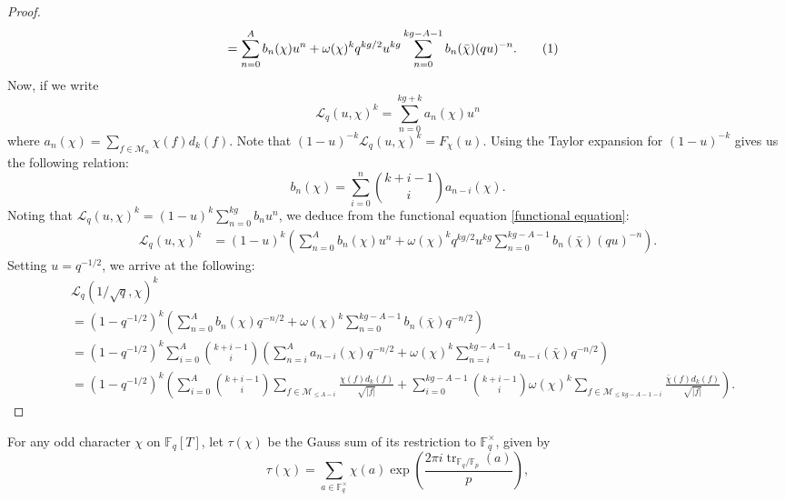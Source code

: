 \documentclass[table]{amsart}
\newcommand{\cM}{\mathcal{M}}
\newcommand{\op}[1]{\operatorname{#1}}
\newcommand\numberthis{\addtocounter{equation}{1}\tag{\theequation}}
\numberwithin{equation}{section}
\begin{document}
\begin{proof}
\begin{align*}
    &=\sum_{n=0}^{A} b_n(\chi) u^{n}+\omega(\chi)^k q^{kg/2}u^{kg}\sum_{n=0}^{kg-A-1}b_n(\bar \chi)(qu)^{-n}.\numberthis\label{functional equation}
\end{align*}
Now, if we  write
$$
\mathcal{L}_q\left(u, \chi\right)^{k}=\sum_{n=0}^{k g+k} a_n(\chi) u^{n}
$$
where $a_n(\chi)=\sum_{f \in \mathcal{M}_{n}} \chi(f) d_{k}(f)$.  %
Note that $(1-u)^{-k}\mathcal{L}_q\left(u, \chi\right)^{k}=F_\chi(u)$. Using the Taylor expansion for $(1-u)^{-k}$ gives us the following relation: 
\begin{equation}\label{binomial inversion}
    b_n(\chi)=\sum_{i=0}^{n} \binom{k+i-1}{i} a_{n-i}(\chi).
\end{equation}
 Noting that $\mathcal{L}_q\left(u, \chi\right)^{k}=(1-u)^k\sum_{n=0}^{kg}b_n u^n$, we deduce from the functional equation \eqref{functional equation}:
\begin{align*}
    \mathcal{L}_q\left(u, \chi\right)^{k}&=(1-u)^k\left(\sum_{n=0}^{A} b_n(\chi) u^{n}+\omega(\chi)^k q^{kg/2}u^{kg}\sum_{n=0}^{kg-A-1}b_n(\bar \chi)(qu)^{-n}\right).
\end{align*}
Setting $u=q^{-1/2}$, we arrive at the following:
{\small\begin{align*}&\mathcal{L}_q\left(1/\sqrt{q}, \chi\right)^{k}\\
    & =(1-q^{-1/2})^k\left(\sum_{n=0}^{A} b_n(\chi) q^{-n/2}+\omega(\chi)^k \sum_{n=0}^{kg-A-1}b_n(\bar \chi)q^{-n/2}\right)\\&=(1-q^{-1/2})^k\sum_{i=0}^{A}\binom{k+i-1}{i}\left(\sum_{n=i}^{A} a_{n-i}(\chi) q^{-n/2}+\omega(\chi)^k \sum_{n=i}^{kg-A-1}a_{n-i}(\bar \chi)q^{-n/2}\right)\\&
 =  (1-q^{-1/2})^k \left(\sum_{i=0}^{A}\binom{k+i-1}{i}\sum_{f\in \cM_{\leq A-i}}\frac{\chi(f)d_k(f)}{\sqrt{|f|}}+ \sum_{i=0}^{kg-A-1}\binom{k+i-1}{i}\omega(\chi)^k\sum_{f\in \cM_{\leq kg-A-1-i}}  \frac{\bar{\chi}(f) d_{k}(f)}{\sqrt{|f|}}\right).
\end{align*}}
\end{proof}
\par For any odd character \(\chi\) on \(\mathbb{F}_q[T]\), let \(\tau(\chi)\) be the Gauss sum of its restriction to \(\mathbb{F}_q^\times\), given by  
\[
\tau(\chi) = \sum_{a \in \mathbb{F}_{q}^{\times}} \chi(a) \op{exp}\left(\frac{2\pi i \op{tr}_{\mathbb{F}_{q} / \mathbb{F}_{p}}(a)}{ p}\right),
\]
\end{document}
